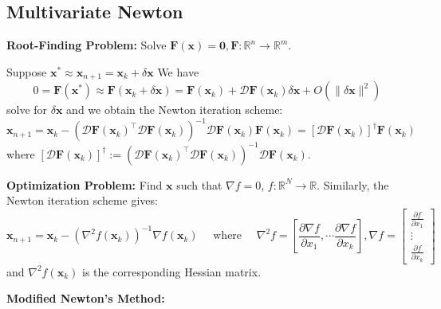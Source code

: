 \documentclass[11pt]{article}
\theoremstyle{plain} %
\newenvironment{topic}
{\color{C2}\normalfont\begin{framed}\begingroup }
  {\endgroup\end{framed}}
\theoremstyle{remark}
\begin{document}
\subsection{Multivariate Newton}
\begin{topic}
  \textbf{Root-Finding Problem:} Solve $\mathbf{F}(\mathbf{x})=\boldsymbol{0} , \mathbf{F}:\mathbb{R}^n \rightarrow \mathbb{R}^m$.

  Suppose $\mathbf{x}^* \approx \mathbf{x}_{n+1} = \mathbf{x}_k+\delta \mathbf{x}$ We have
  $$
    0=\mathbf{F}\left(\mathbf{x}^*\right)\approx\mathbf{F}\left(\mathbf{x}_k+\delta \mathbf{x}\right)=\mathbf{F}\left(\mathbf{x}_k\right)+\mathcal{D} \mathbf{F}\left(\mathbf{x}_k\right) \delta \mathbf{x}+O(\|\delta \mathbf{x}\|^2)
  $$
  solve for $\delta \mathbf{x}$ and we obtain the Newton iteration scheme:
  $$
    \mathbf{x}_{n+1}=\mathbf{x}_k-\left(\mathcal{\mathcal{D}} \mathbf{F}\left(\mathbf{x}_k\right)^{\top} \mathcal{D} \mathbf{F}\left(\mathbf{x}_k\right)\right)^{-1} \mathcal{D} \mathbf{F}\left(\mathbf{x}_k\right) \mathbf{F}\left(\mathbf{x}_k\right)
    = \left[\mathcal{D} \mathbf{F}\left(\mathbf{x}_k\right)\right]^\dagger\mathbf{F}\left(\mathbf{x}_k\right)
  $$
  where $\left[\mathcal{D} \mathbf{F}\left(\mathbf{x}_k\right)\right]^\dagger := \left(\mathcal{\mathcal{D}} \mathbf{F}\left(\mathbf{x}_k\right)^{\top} \mathcal{D} \mathbf{F}\left(\mathbf{x}_k\right)\right)^{-1} \mathcal{D} \mathbf{F}\left(\mathbf{x}_k\right)$.


  \textbf{Optimization Problem:} Find $\mathbf{x}$ such that $\nabla f= 0$,  $f: \mathbb{R}^N \rightarrow \mathbb{R}$.
  Similarly, the Newton iteration scheme gives:
  $$
    \mathbf{x}_{n+1}=\mathbf{x}_k-\left(\nabla^2 f\left(\mathbf{x}_k\right)\right)^{-1} \nabla f\left(\mathbf{x}_k\right)
    \quad \text{ where } \quad
    \nabla^2 f=\left[\frac{\partial \nabla f}{\partial x_1}, \cdots \frac{\partial \nabla f}{\partial x_k}\right], \nabla f=\left[\begin{array}{c}
        \frac{\partial f}{\partial x_1} \\
        \vdots                          \\
        \frac{\partial f}{\partial x_k}
      \end{array}\right]
  $$
  and $\nabla^2 f\left(\mathbf{x}_k\right)$ is the corresponding Hessian matrix.

  \textbf{Modified Newton's Method:}


\end{topic}
\end{document}
